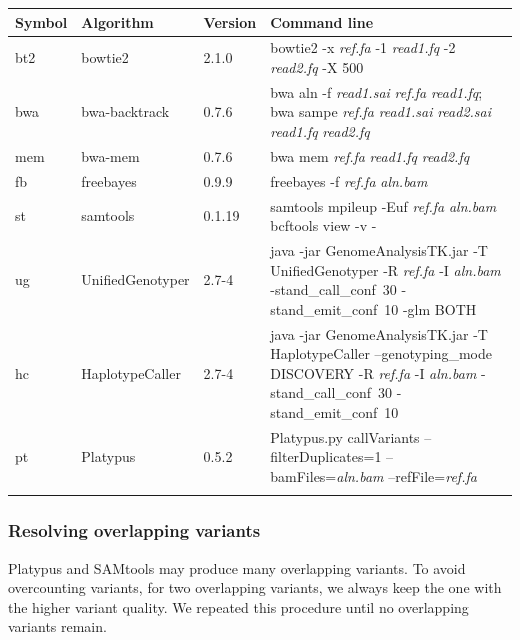 \documentclass{bioinfo}
\begin{document}
\begin{methods}
\begin{table}
\footnotesize
{}
{\begin{tabular*}{\textwidth}{@{\extracolsep{\fill}}lp{1.8cm}lp{12.5cm}}
\toprule
Symbol & Algorithm & Version & Command line \\
\midrule
bt2 & bowtie2 & 2.1.0 & bowtie2 -x \emph{ref.fa} -1 \emph{read1.fq} -2 \emph{read2.fq} -X 500 \\
bwa & bwa-backtrack & 0.7.6 & bwa aln -f \emph{read1.sai} \emph{ref.fa} \emph{read1.fq}; bwa sampe \emph{ref.fa} \emph{read1.sai} \emph{read2.sai} \emph{read1.fq} \emph{read2.fq} \\
mem & bwa-mem & 0.7.6 & bwa mem \emph{ref.fa} \emph{read1.fq} \emph{read2.fq} \\
fb & freebayes & 0.9.9 & freebayes -f \emph{ref.fa} \emph{aln.bam} \\
st & samtools & 0.1.19 & samtools mpileup -Euf \emph{ref.fa} \emph{aln.bam} {\tt \char124} bcftools view -v - \\
ug & UnifiedGenotyper & 2.7-4 & java -jar GenomeAnalysisTK.jar -T UnifiedGenotyper -R \emph{ref.fa} -I \emph{aln.bam} \mbox{-stand\_call\_conf 30} \mbox{-stand\_emit\_conf 10} -glm BOTH \\
hc & HaplotypeCaller & 2.7-4 & java -jar GenomeAnalysisTK.jar -T HaplotypeCaller --genotyping\_mode DISCOVERY -R \emph{ref.fa} -I \emph{aln.bam} \mbox{-stand\_call\_conf 30} \mbox{-stand\_emit\_conf 10} \\
pt & Platypus & 0.5.2 & Platypus.py callVariants --filterDuplicates=1 --bamFiles=\emph{aln.bam} --refFile=\emph{ref.fa} \\
\botrule
\end{tabular*}}{}
\end{table}

\subsubsection{Resolving overlapping variants} Platypus and SAMtools may
produce many overlapping variants. To avoid overcounting variants, for two
overlapping variants, we always keep the one with the higher variant quality.
We repeated this procedure until no overlapping variants remain.


\end{methods}
\end{document}
